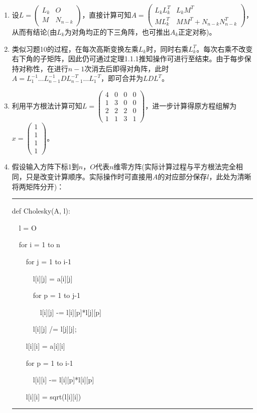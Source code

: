 \documentclass[a4paper,UTF8,fontset=windows]{ctexart}
\newenvironment{code}{\rule{36em}{0.1em}\setlength{\parindent}{1em}\setmainfont{Consolas}

}{

\setlength{\parindent}{0em}\rule{36em}{0.1em}}
\begin{document}
\begin{enumerate}
\item
设$L=\begin{pmatrix}L_k&O\\M&N_{n-k}\end{pmatrix}$，直接计算可知$A=\begin{pmatrix}L_kL_k^T&L_kM^T\\ML_k^T&MM^T+N_{n-k}N_{n-k}^T\end{pmatrix}$，从而有结论(由$L_k$为对角均正的下三角阵，也可推出$A_k$正定对称)。

\item
类似习题10的过程，在每次高斯变换左乘$L_k$时，同时右乘$L_k^T$。每次右乘不改变右下角的子矩阵，因此仍可通过定理1.1.1推知操作可进行至结束。由于每步保持对称性，在进行$n-1$次消去后即得对角阵，此时$A=L_1^{-1}\dots L_{n-1}^{-1}DL_{n-1}^{-T}\dots L_1^{-T}$，即可合并为$LDL^T$。

\item
利用平方根法计算可知$L=\begin{pmatrix}4&0&0&0\\1&3&0&0\\2&2&2&0\\1&1&3&1\end{pmatrix}$，进一步计算得原方程组解为$x=\begin{pmatrix}1\\1\\1\\1\end{pmatrix}$。

\item
假设输入方阵下标1到$n$，$O$代表$n$维零方阵(实际计算过程与平方根法完全相同，只是改变计算顺序。实际操作时可直接用$A$的对应部分保存$l$，此处为清晰将两矩阵分开)：

\begin{code}
def Cholesky(A, l):

\ \ l = O

\ \ for i = 1 to n

\ \ \ \ for j = 1 to i-1

\ \ \ \ \ \ l[i][j] = a[i][j]

\ \ \ \ \ \ for p = 1 to j-1

\ \ \ \ \ \ \ \ l[i][j] -= l[i][p]*l[j][p]

\ \ \ \ \ \ l[i][j] /= l[j][j];

\ \ \ \ l[i][i] = a[i][i]

\ \ \ \ for p = 1 to i-1

\ \ \ \ \ \ l[i][i] -= l[i][p]*l[i][p]

\ \ \ \ l[i][i] = sqrt(l[i][i])
\end{code}


\end{enumerate}
\end{document}
